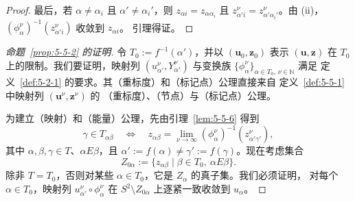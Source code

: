 \begin{proof}
最后，若 $\alpha\ne\alpha_i$ 且 $\alpha'\ne\alpha_i'$，则
$z_{\alpha i}=z_{\alpha\alpha_i}$ 且
$z_{\alpha'i}^\nu=z_{\alpha'\alpha_i'}^\nu$。由 (ii)，
$(\phi_\alpha^\nu)^{-1}(z_{\alpha'i}^\nu)$ 收敛到 $z_{\alpha i}$。
引理得证。
\end{proof}

\begin{proof}[命题~\ref{prop:5-5-2} 的证明]
令 $T_0:=f^{-1}(\alpha')$，并以 $(\mathbf u_0,\mathbf z_0)$ 表示
$(\mathbf u,\mathbf z)$ 在 $T_0$ 上的限制。我们要证明，映射列
$(u_{\alpha'}^\nu,Y_{\alpha'}^\nu)$ 与变换族
$\{\phi_\alpha^\nu\}_{\alpha\in T_0,\,\nu\in\mathbb N}$ 满足
定义~\ref{def:5-2-1} 的要求。其（重标度）和（标记点）公理直接来自
定义~\ref{def:5-5-1} 中映射列 $(\mathbf u^\nu,\mathbf z^\nu)$ 的
（重标度）、（节点）与（标记点）公理。

为建立（映射）和（能量）公理，先由引理~\ref{lem:5-5-6} 得到
\begin{equation}\label{eq:5-5-2}
  \gamma\in T_{\alpha\beta}
  \quad\Longleftrightarrow\quad
  z_{\alpha\beta}
  =\lim_{\nu\to\infty}
  (\phi_\alpha^\nu)^{-1}(z_{\alpha'\gamma'}^\nu),
\end{equation}
其中 $\alpha,\beta,\gamma\in T$、$\alpha E\beta$，且
$\alpha':=f(\alpha)\ne\gamma':=f(\gamma)$。现在考虑集合
\[
  Z_{0\alpha}:=\{z_{\alpha\beta}\mid
    \beta\in T_0,\ \alpha E\beta\}.
\]
除非 $T=T_0$，否则对某些 $\alpha\in T_0$，它是 $Z_\alpha$ 的真子集。我们必须证明，
对每个 $\alpha\in T_0$，映射列
$u_{\alpha'}^\nu\circ\phi_\alpha^\nu$ 在
$S^2\setminus Z_{0\alpha}$ 上逐紧一致收敛到 $u_\alpha$。


\end{proof}
